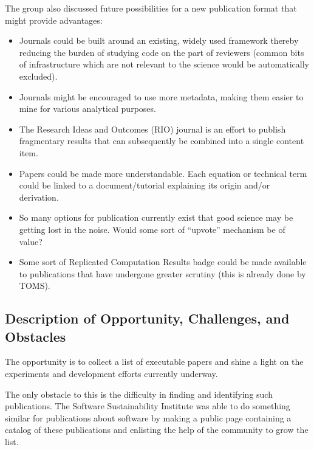 The group also discussed future possibilities for a new publication format
that might provide advantages:
\begin{itemize}

\item Journals could be built around an existing, widely used framework thereby
reducing the burden of studying code on the part of reviewers (common bits of
infrastructure which are not relevant to the science would be automatically
excluded).

\item Journals might be encouraged to use more metadata, making them easier to
mine for various analytical purposes.

\item The Research Ideas and Outcomes (RIO) journal is an effort to publish fragmentary results that can subsequently be
combined into a single content item.

\item Papers could be made more understandable. Each equation or technical term
could be linked to a document/tutorial explaining its origin and/or
derivation.

\item So many options for publication currently exist that good science may be
getting lost in the noise. Would some sort of ``upvote'' mechanism be of value?

\item Some sort of Replicated Computation Results badge could be made available
to publications that have undergone greater scrutiny (this is already done by
TOMS).
  
\end{itemize}

\subsection{Description of Opportunity, Challenges, and Obstacles}

The opportunity is to collect a list of executable papers and shine a
light on the experiments and development efforts currently underway.

The only obstacle to this is the difficulty in finding and identifying such
publications. The Software Sustainability Institute was able to do something
similar for publications about software by making a public page  containing a
catalog of these publications and enlisting the help of the community to grow
the list. 

